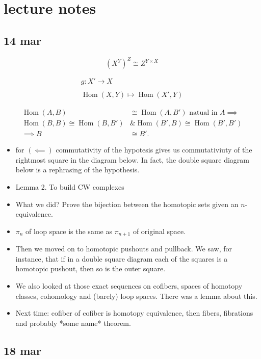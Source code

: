 \documentclass{article}
\DeclareMathOperator{\Hom}{Hom}
\begin{document}
\section{lecture notes}
\subsection{14 mar}

\[(X^Y)^Z\cong Z^{Y\times X}\]

\begin{align*}
	g:X'\to X\\\\
	\Hom(X,Y)\mapsto\Hom(X',Y)
\end{align*}

\begin{align*}
	\Hom(A,B)&\cong\Hom(A,B')\text{ natual in }A\implies\\ \Hom(B,B)\cong\Hom(B,B')&\& \Hom(B',B)\cong\Hom(B',B')\\\implies B&\cong B'.
\end{align*}


\begin{itemize}
	\item for $(\impliedby)$ commutativity of the hypotesis gives us commutativiuty of the rightmost square in the diagram below. In fact, the double square diagram below is a rephrasing of the hypothesis.
	
	\item Lemma 2. To build CW complexes
	\item What we did? Prove the bijection between the homotopic sets given an $n$-equivalence.
	\item $\pi_n$ of loop space is the same as $\pi_{n+1}$ of original space.
	\item Then we moved on to homotopic pushouts and pullback. We saw, for instance, that if in a double square diagram each of the squares is a homotopic pushout, then so is the outer square.
	\item We also looked at those exact sequences on cofibers, spaces of homotopy classes, cohomology and (barely) loop spaces. There was a lemma about this.
	\item Next time: cofiber of cofiber is homotopy equivalence, then fibers, fibrations and probably *some name* theorem.
\end{itemize}

\subsection{18 mar}
\end{document}
